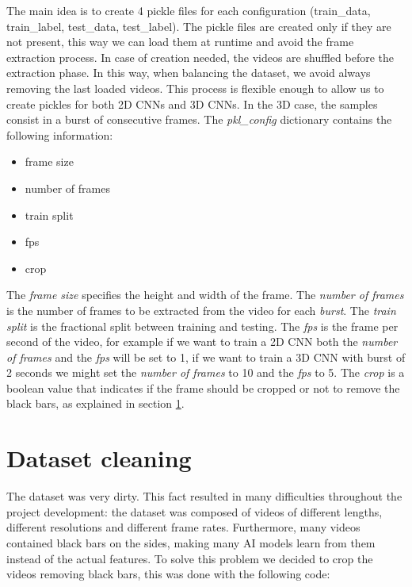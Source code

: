 The main idea is to create 4 pickle files for each configuration (train\_data, train\_label, test\_data, test\_label). The pickle files are created only if they are not present, this way we can load them at runtime and avoid the frame extraction process. In case of creation needed, the videos are shuffled before the extraction phase. In this way, when balancing the dataset, we avoid always removing the last loaded videos. This process is flexible enough to allow us to create pickles for both 2D CNNs and 3D CNNs. In the 3D case, the samples consist in a burst of consecutive frames. The \textit{pkl\_config} dictionary contains the following information:
\begin{itemize}
	\item frame size
	\item number of frames
	\item train split
	\item fps
	\item crop
\end{itemize}
The \textit{frame size} specifies the height and width of the frame. The \textit{number of frames} is the number of frames to be extracted from the video for each \textit{burst}. The \textit{train split} is the fractional split between training and testing. The \textit{fps} is the frame per second of the video, for example if we want to train a 2D CNN both the \textit{number of frames} and the \textit{fps} will be set to 1, if we want to train a 3D CNN with burst of 2 seconds we might set the \textit{number of frames} to 10 and the \textit{fps} to 5. The \textit{crop} is a boolean value that indicates if the frame should be cropped or not to remove the black bars, as explained in section \ref{sec:datasetcleaning}.

\section{Dataset cleaning}
\label{sec:datasetcleaning}
The dataset was very dirty. This fact resulted in many difficulties throughout the project development: the dataset was composed of videos of different lengths, different resolutions and different frame rates. Furthermore, many videos contained black bars on the sides, making many AI models learn from them instead of the actual features. To solve this problem we decided to crop the videos removing black bars, this was done with the following code:

